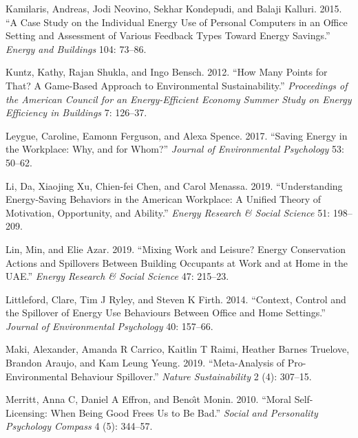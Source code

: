 \documentclass[
  11pt,
]{article}
\newlength{\cslhangindent}
\newlength{\cslentryspacingunit} %
\newenvironment{CSLReferences}[2] %
 {%
  \setlength{\parindent}{0pt}
  \ifodd #1
  \let\oldpar\par
  \def\par{\hangindent=\cslhangindent\oldpar}
  \fi
  \setlength{\parskip}{#2\cslentryspacingunit}
 }%
 {}
\begin{document}
\begin{CSLReferences}{1}{0}
\leavevmode{}%
Kamilaris, Andreas, Jodi Neovino, Sekhar Kondepudi, and Balaji Kalluri.
2015. {``A Case Study on the Individual Energy Use of Personal Computers
in an Office Setting and Assessment of Various Feedback Types Toward
Energy Savings.''} \emph{Energy and Buildings} 104: 73--86.

\leavevmode{}%
Kuntz, Kathy, Rajan Shukla, and Ingo Bensch. 2012. {``How Many Points
for That? A Game-Based Approach to Environmental Sustainability.''}
\emph{Proceedings of the American Council for an Energy-Efficient
Economy Summer Study on Energy Efficiency in Buildings} 7: 126--37.

\leavevmode{}%
Leygue, Caroline, Eamonn Ferguson, and Alexa Spence. 2017. {``Saving
Energy in the Workplace: Why, and for Whom?''} \emph{Journal of
Environmental Psychology} 53: 50--62.

\leavevmode{}%
Li, Da, Xiaojing Xu, Chien-fei Chen, and Carol Menassa. 2019.
{``Understanding Energy-Saving Behaviors in the American Workplace: A
Unified Theory of Motivation, Opportunity, and Ability.''} \emph{Energy
Research \& Social Science} 51: 198--209.

\leavevmode{}%
Lin, Min, and Elie Azar. 2019. {``Mixing Work and Leisure? Energy
Conservation Actions and Spillovers Between Building Occupants at Work
and at Home in the UAE.''} \emph{Energy Research \& Social Science} 47:
215--23.

\leavevmode{}%
Littleford, Clare, Tim J Ryley, and Steven K Firth. 2014. {``Context,
Control and the Spillover of Energy Use Behaviours Between Office and
Home Settings.''} \emph{Journal of Environmental Psychology} 40:
157--66.

\leavevmode{}%
Maki, Alexander, Amanda R Carrico, Kaitlin T Raimi, Heather Barnes
Truelove, Brandon Araujo, and Kam Leung Yeung. 2019. {``Meta-Analysis of
Pro-Environmental Behaviour Spillover.''} \emph{Nature Sustainability} 2
(4): 307--15.

\leavevmode{}%
Merritt, Anna C, Daniel A Effron, and Benoı̂t Monin. 2010. {``Moral
Self-Licensing: When Being Good Frees Us to Be Bad.''} \emph{Social and
Personality Psychology Compass} 4 (5): 344--57.


\end{CSLReferences}
\end{document}
